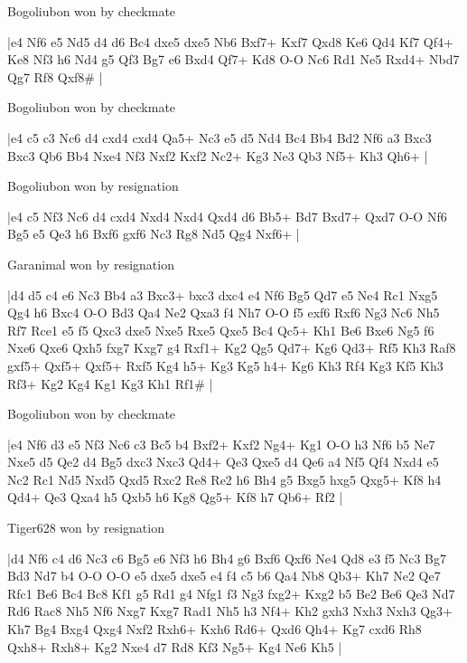 \showboard

Bogoliubon won by checkmate

\makegametitle
|e4 Nf6 e5 Nd5 d4 d6 Bc4 dxe5 dxe5 Nb6 Bxf7+ Kxf7 Qxd8 Ke6 Qd4 Kf7 Qf4+ Ke8 Nf3 h6 Nd4 g5 Qf3 Bg7 e6 Bxd4 Qf7+ Kd8 O-O Nc6 Rd1 Ne5 Rxd4+ Nbd7 Qg7 Rf8 Qxf8\#  |

\showboard

Bogoliubon won by checkmate

\makegametitle
|e4 c5 c3 Nc6 d4 cxd4 cxd4 Qa5+ Nc3 e5 d5 Nd4 Bc4 Bb4 Bd2 Nf6 a3 Bxc3 Bxc3 Qb6 Bb4 Nxe4 Nf3 Nxf2 Kxf2 Nc2+ Kg3 Ne3 Qb3 Nf5+ Kh3 Qh6+  |

\showboard

Bogoliubon won by resignation

\makegametitle
|e4 c5 Nf3 Nc6 d4 cxd4 Nxd4 Nxd4 Qxd4 d6 Bb5+ Bd7 Bxd7+ Qxd7 O-O Nf6 Bg5 e5 Qe3 h6 Bxf6 gxf6 Nc3 Rg8 Nd5 Qg4 Nxf6+  |

\showboard

Garanimal won by resignation

\makegametitle
|d4 d5 c4 e6 Nc3 Bb4 a3 Bxc3+ bxc3 dxc4 e4 Nf6 Bg5 Qd7 e5 Ne4 Rc1 Nxg5 Qg4 h6 Bxc4 O-O Bd3 Qa4 Ne2 Qxa3 f4 Nh7 O-O f5 exf6 Rxf6 Ng3 Nc6 Nh5 Rf7 Rce1 e5 f5 Qxc3 dxe5 Nxe5 Rxe5 Qxe5 Bc4 Qc5+ Kh1 Be6 Bxe6 Ng5 f6 Nxe6 Qxe6 Qxh5 fxg7 Kxg7 g4 Rxf1+ Kg2 Qg5 Qd7+ Kg6 Qd3+ Rf5 Kh3 Raf8 gxf5+ Qxf5+ Qxf5+ Rxf5 Kg4 h5+ Kg3 Kg5 h4+ Kg6 Kh3 Rf4 Kg3 Kf5 Kh3 Rf3+ Kg2 Kg4 Kg1 Kg3 Kh1 Rf1\#  |

\showboard

Bogoliubon won by checkmate

\makegametitle
|e4 Nf6 d3 e5 Nf3 Nc6 c3 Bc5 b4 Bxf2+ Kxf2 Ng4+ Kg1 O-O h3 Nf6 b5 Ne7 Nxe5 d5 Qe2 d4 Bg5 dxc3 Nxc3 Qd4+ Qe3 Qxe5 d4 Qe6 a4 Nf5 Qf4 Nxd4 e5 Nc2 Rc1 Nd5 Nxd5 Qxd5 Rxc2 Re8 Re2 h6 Bh4 g5 Bxg5 hxg5 Qxg5+ Kf8 h4 Qd4+ Qe3 Qxa4 h5 Qxb5 h6 Kg8 Qg5+ Kf8 h7 Qb6+ Rf2  |

\showboard

Tiger628 won by resignation

\makegametitle
|d4 Nf6 c4 d6 Nc3 c6 Bg5 e6 Nf3 h6 Bh4 g6 Bxf6 Qxf6 Ne4 Qd8 e3 f5 Nc3 Bg7 Bd3 Nd7 b4 O-O O-O e5 dxe5 dxe5 e4 f4 c5 b6 Qa4 Nb8 Qb3+ Kh7 Ne2 Qe7 Rfc1 Be6 Bc4 Bc8 Kf1 g5 Rd1 g4 Nfg1 f3 Ng3 fxg2+ Kxg2 b5 Be2 Be6 Qe3 Nd7 Rd6 Rac8 Nh5 Nf6 Nxg7 Kxg7 Rad1 Nh5 h3 Nf4+ Kh2 gxh3 Nxh3 Nxh3 Qg3+ Kh7 Bg4 Bxg4 Qxg4 Nxf2 Rxh6+ Kxh6 Rd6+ Qxd6 Qh4+ Kg7 cxd6 Rh8 Qxh8+ Rxh8+ Kg2 Nxe4 d7 Rd8 Kf3 Ng5+ Kg4 Ne6 Kh5  |

